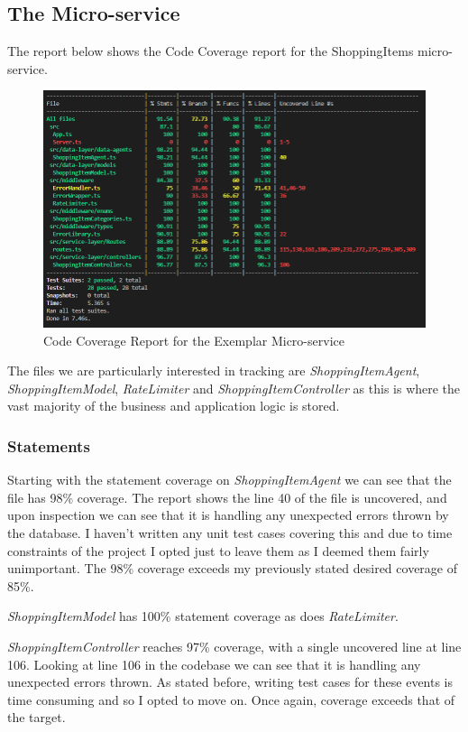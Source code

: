 \subsection{The Micro-service}
The report below shows the Code Coverage report for the ShoppingItems micro-service.
\begin{figure}[!htb]
\caption{Code Coverage Report for the Exemplar Micro-service}
\centering
\includegraphics[scale=0.62]{FYP_Dissertation_template/Figures/microservice-code-coverage.PNG}
\end{figure}
\FloatBarrier
The files we are particularly interested in tracking are \textit{ShoppingItemAgent}, \textit{ShoppingItemModel}, \textit{RateLimiter} and \textit{ShoppingItemController} as this is where the vast majority of the business and application logic is stored.
\subsubsection{Statements}
Starting with the statement coverage on \textit{ShoppingItemAgent} we can see that the file has 98\% coverage. The report shows the line 40 of the file is uncovered, and upon inspection we can see that it is handling any unexpected errors thrown by the database. I haven't written any unit test cases covering this and due to time constraints of the project I opted just to leave them as I deemed them fairly unimportant. The 98\% coverage exceeds my previously stated desired coverage of 85\%.

\textit{ShoppingItemModel} has 100\% statement coverage as does \textit{RateLimiter}.

\textit{ShoppingItemController} reaches 97\% coverage, with a single uncovered line at line 106. Looking at line 106 in the codebase we can see that it is handling any unexpected errors thrown. As stated before, writing test cases for these events is time consuming and so I opted to move on. Once again, coverage exceeds that of the target. 

